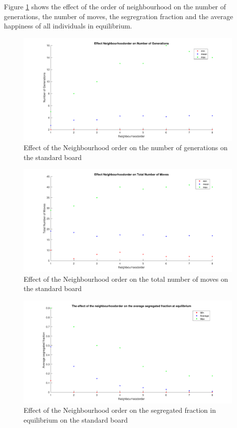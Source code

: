Figure \ref{fig:nbho-generations} shows the effect of the order of neighbourhood on the number of generations, the number of moves, the segregration fraction and the average happiness of all individuals in equilibrium.

\begin{figure}[H]
	\centering
    \includegraphics[width=\textwidth]{buurtorde-aantgen.pdf}
    \caption{Effect of the Neighbourhood order on the number of generations on the standard board}
    \label{fig:nbho-generations}
\end{figure}

\begin{figure}[H]
	\centering
    \includegraphics[width=\textwidth]{buurtorde-aantmov.pdf}
    \caption{Effect of the Neighbourhood order on the total number of moves on the standard board}
    \label{fig:nbho-moves}
\end{figure}

\begin{figure}[H]
	\centering
    \includegraphics[width=\textwidth]{buurtorde-segreind.pdf}
    \caption{Effect of the Neighbourhood order on the segregated fraction in equilibrium on the standard board}
    \label{fig:nbho-segregation}
\end{figure}

